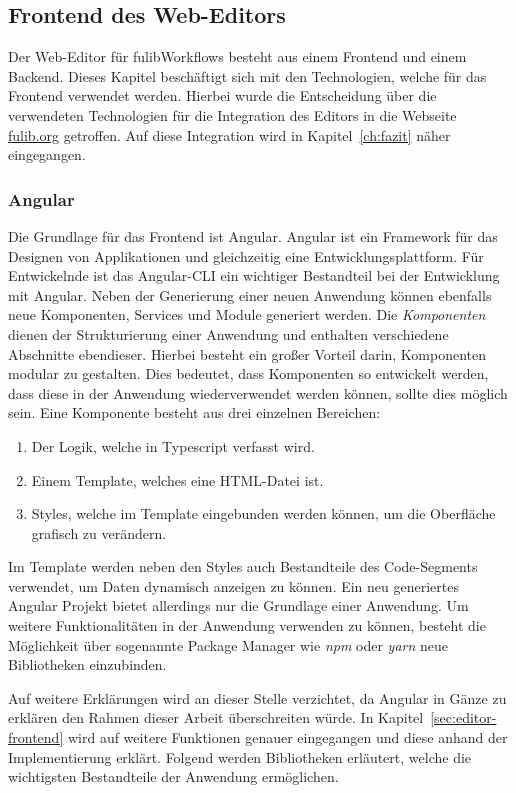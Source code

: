\subsection{Frontend des Web-Editors}\label{subsec:fulibworkflows-web-editor}
Der Web-Editor für fulibWorkflows besteht aus einem Frontend und einem Backend.
Dieses Kapitel beschäftigt sich mit den Technologien, welche für das Frontend verwendet werden.
Hierbei wurde die Entscheidung über die verwendeten Technologien für die Integration des Editors in die Webseite \url{fulib.org} getroffen.
Auf diese Integration wird in Kapitel~\ref{ch:fazit} näher eingegangen.

\subsubsection{Angular}
Die Grundlage für das Frontend ist Angular.
Angular ist ein Framework für das Designen von Applikationen und gleichzeitig eine Entwicklungsplattform\cite*{angular}.
Für Entwickelnde ist das Angular-\ac{CLI} ein wichtiger Bestandteil bei der Entwicklung mit Angular.
Neben der Generierung einer neuen Anwendung können ebenfalls neue Komponenten, Services und Module generiert werden.
Die \textit{Komponenten} dienen der Strukturierung einer Anwendung und enthalten verschiedene Abschnitte ebendieser.
Hierbei besteht ein großer Vorteil darin, Komponenten modular zu gestalten.
Dies bedeutet, dass Komponenten so entwickelt werden, dass diese in der Anwendung wiederverwendet werden können, sollte dies möglich sein.
Eine Komponente besteht aus drei einzelnen Bereichen:

\begin{enumerate}
    \item Der Logik, welche in Typescript verfasst wird.
    \item Einem Template, welches eine HTML-Datei ist.
    \item Styles, welche im Template eingebunden werden können, um die Oberfläche grafisch zu verändern.
\end{enumerate}

Im Template werden neben den Styles auch Bestandteile des Code-Segments verwendet, um Daten dynamisch anzeigen zu können.
Ein neu generiertes Angular Projekt bietet allerdings nur die Grundlage einer Anwendung.
Um weitere Funktionalitäten in der Anwendung verwenden zu können, besteht die Möglichkeit über sogenannte Package Manager wie \textit{npm} oder \textit{yarn}
neue Bibliotheken einzubinden.

Auf weitere Erklärungen wird an dieser Stelle verzichtet, da Angular in Gänze zu erklären den Rahmen dieser Arbeit überschreiten würde.
In Kapitel~\ref{sec:editor-frontend} wird auf weitere Funktionen genauer eingegangen und diese anhand der Implementierung erklärt.
Folgend werden Bibliotheken erläutert, welche die wichtigsten Bestandteile der Anwendung ermöglichen.

